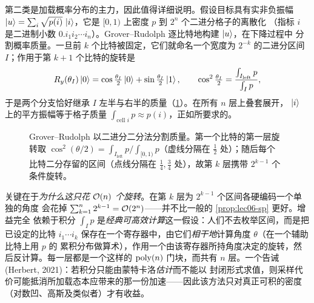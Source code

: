 \begin{remark}
\label{rem:lec06-gr}
第二类是加载概率分布的主力，因此值得详细说明。假设目标具有实非负振幅
$\ket{u}=\sum_{i}\sqrt{p(i)}\,\ket{i}$，它是 $[0,1)$ 上密度 $p$ 到 $2^{n}$ 个二进分格子的离散化
（指标 $i$ 是二进制小数 $0.i_1i_2\cdots i_n$）。Grover--Rudolph 逐比特地构建 $\ket{u}$，在下降过程中
分割概率质量。一旦前 $k$ 个比特被固定，它们就命名一个宽度为 $2^{-k}$ 的二进分区间 $I$；作用于第
$k{+}1$ 个比特的旋转是
\[
  R_y(\theta_I)\ket0=\cos\tfrac{\theta_I}{2}\ket0+\sin\tfrac{\theta_I}{2}\ket1,
  \qquad
  \cos^{2}\tfrac{\theta_I}{2}=\frac{\int_{I_{\mathrm{left}}}p}{\int_{I}p},
\]
于是两个分支恰好继承 $I$ 左半与右半的质量（\cref{fig:lec06-gr}）。在所有 $n$ 层上叠套展开，
$\ket i$ 上的平方振幅等于格子质量 $\int_{\text{cell }i}p\approx p(i)$，正如所要求的。
\begin{figure}[ht]
\centering
{}
\caption{Grover--Rudolph 以二进分二分法分割质量。第一个比特的第一层旋转取
$\cos^2(\theta/2)=\int_{I_{\mathrm{left}}}p\big/\int_{[0,1)}p$（虚线分隔在 $\tfrac12$ 处）；随后每个
比特二分存留的区间（点线分隔在 $\tfrac14,\tfrac34$ 处），故第 $k$ 层携带 $2^{k-1}$ 个条件旋转。}
\label{fig:lec06-gr}
\end{figure}

关键在于\emph{为什么这只花 $\mathcal{O}(n)$ 个旋转}。在第 $k$ 层为 $2^{k-1}$ 个区间各硬编码一个单独的角度
会花掉 $\sum_{k=1}^{n}2^{k-1}=\mathcal{O}(2^{n})$——并不比一般的 \cref{prop:lec06-sp} 更好。增益完全
依赖于积分 $\int_{I}p$ 是\emph{经典可高效计算}这一假设：人们不去枚举区间，而是把已设定的比特
$i_1\cdots i_k$ 保存在一个寄存器中，由它们\emph{相干地}计算角度 $\theta$（在一个辅助比特上用 $p$ 的
累积分布做算术），作用一个由该寄存器所持角度决定的旋转，然后反计算。每一层都是一个这样的
$\operatorname{poly}(n)$ 门块，而共有 $n$ 层。一个告诫 (Herbert, 2021)：若积分只能由蒙特卡洛\emph{估计}而不能以
封闭形式求值，则采样代价可能抵消所加载态本应带来的那一份加速——因此该方法只对真正可积的密度
（对数凹、高斯及类似者）才有收益。
\end{remark}

